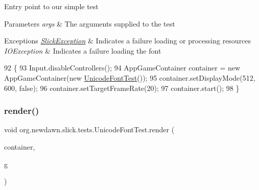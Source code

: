 Entry point to our simple test


\begin{DoxyParams}{Parameters}
{\em args} & The arguments supplied to the test \\
\hline
\end{DoxyParams}

\begin{DoxyExceptions}{Exceptions}
{\em \mbox{\hyperlink{classorg_1_1newdawn_1_1slick_1_1_slick_exception}{Slick\+Exception}}} & Indicates a failure loading or processing resources \\
\hline
{\em I\+O\+Exception} & Indicates a failure loading the font \\
\hline
\end{DoxyExceptions}

\begin{DoxyCode}
92                                                                               \{
93         Input.disableControllers();
94         AppGameContainer container = \textcolor{keyword}{new} AppGameContainer(\textcolor{keyword}{new} \mbox{\hyperlink{classorg_1_1newdawn_1_1slick_1_1tests_1_1_unicode_font_test_ac21683decce5c4a0fd9cf077aa2261df}{UnicodeFontTest}}());
95         container.setDisplayMode(512, 600, \textcolor{keyword}{false});
96         container.setTargetFrameRate(20);
97         container.start();
98     \}
\end{DoxyCode}
\mbox{\label{classorg_1_1newdawn_1_1slick_1_1tests_1_1_unicode_font_test_ad13018ace3c5718bf77cab61408dfdb2}} 
\subsubsection{\texorpdfstring{render()}{render()}}
{\footnotesize\ttfamily void org.\+newdawn.\+slick.\+tests.\+Unicode\+Font\+Test.\+render (\begin{DoxyParamCaption}\item[{\mbox{\hyperlink{classorg_1_1newdawn_1_1slick_1_1_game_container}{Game\+Container}}}]{container,  }\item[{\mbox{\hyperlink{classorg_1_1newdawn_1_1slick_1_1_graphics}{Graphics}}}]{g }\end{DoxyParamCaption})\hspace{0.3cm}{\ttfamily [inline]}}

